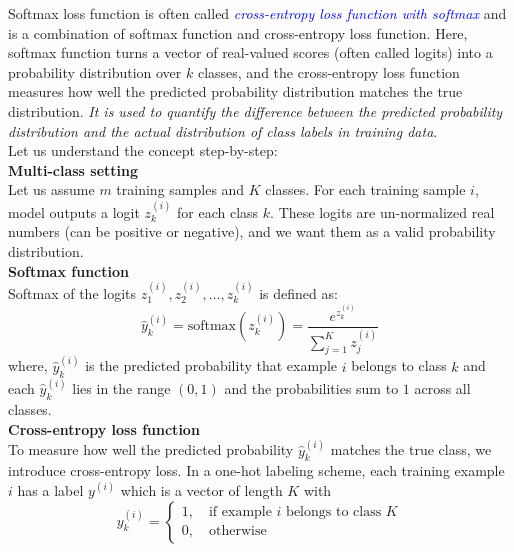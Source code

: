 Softmax loss function is often called \textcolor{blue}{\emph{cross-entropy loss function with softmax}} and is a combination of softmax function and cross-entropy loss function. Here, softmax function turns a vector of real-valued scores (often called logits) into a probability distribution over $k$ classes, and the cross-entropy loss function measures how well the predicted probability distribution matches the true distribution. \emph{It is used to quantify the difference between the predicted probability distribution and the actual distribution of class labels in training data}.\\

Let us understand the concept step-by-step:\\

\textbf{Multi-class setting}\\

Let us assume $m$ training samples and $K$ classes. For each training sample $i$, model outputs a logit $z_k^{(i)}$ for each class $k$. These logits are un-normalized real numbers (can be positive or negative), and we want them as a valid probability distribution.\\

\textbf{Softmax function}\\

Softmax of the logits $z_1^{(i)}, z_2^{(i)}, \ldots, z_k^{(i)}$ is defined as:
\begin{equation}
    \hat{y}_k^{(i)} = \text{softmax}(z_k^{(i)}) = \frac{e^{z_k^{(i)}}}{\sum_{j=1}^{K} z_j^{(i)}}
    \label{eqn:42}
\end{equation}
where, $\hat{y}_k^{(i)}$ is the predicted probability that example $i$ belongs to class $k$ and each $\hat{y}_k^{(i)}$ lies in the range $(0,1)$ and the probabilities sum to $1$ across all classes.\\

\textbf{Cross-entropy loss function}\\

To measure how well the predicted probability $\hat{y}_k^{(i)}$ matches the true class, we introduce cross-entropy loss. In a one-hot labeling scheme, each training example $i$ has a label $y^{(i)}$ which is a vector of length $K$ with
\begin{equation}
    y_k^{(i)} =
    \begin{cases}
        1, \quad \text{if example $i$ belongs to class $K$}\\
        0, \quad \text{otherwise}
    \end{cases}
    \label{eqn:43}
\end{equation}

